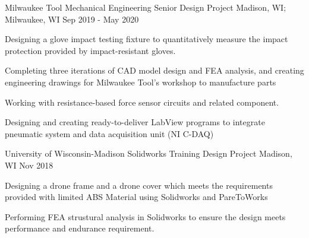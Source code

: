 

\begin{cventries}

  \cventry
    {Milwaukee Tool} %
    {Mechanical Engineering Senior Design Project} %
    {Madison, WI; Milwaukee, WI} %
    {Sep 2019 - May 2020} %
    {
      \begin{cvitems} %
        \item {Designing a glove impact testing fixture to quantitatively measure the impact protection provided by impact-resistant gloves.}
        \item {Completing three iterations of CAD model design and FEA analysis, and creating engineering drawings for Milwaukee Tool's workshop to manufacture parts}
        \item {Working with resistance-based force sensor circuits and related component.}
        \item {Designing and creating ready-to-deliver LabView programs to integrate pneumatic system and data acquisition unit (NI C-DAQ)}
      \end{cvitems}
    }


  \cventry
	{University of Wisconsin-Madison} %
	{Solidworks Training Design Project} %
	{Madison, WI} %
	{Nov 2018} %
	{
		\begin{cvitems} %
			\item {Designing a drone frame and a drone cover which meets the requirements provided with limited ABS Material using Solidworks and PareToWorks}
			\item {Performing FEA strustural analysis in Solidworks to ensure the design meets performance and endurance requirement. }
		\end{cvitems}
	}




\end{cventries}
